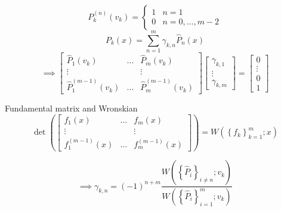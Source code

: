 \documentclass{beamer}
\newcommand{\set}[1]{\left \{ #1 \right \}}
\newcommand{\W}[2]{W \left ( #1 ; #2 \right )}
\begin{document}
\begin{frame}
\begin{equation*}
P_k^{(n)}(v_k) = \begin{cases} 1 & n = 1 \\ 0 & n = 0,...,m-2 \end{cases}
\end{equation*}
\begin{equation*}
P_k(x) = \sum_{n=1}^m \gamma_{k,n} \hat{P}_n(x)
\end{equation*}
\begin{equation*}
\implies \begin{bmatrix} \hat{P}_1(v_k) & \dots & \hat{P}_m(v_k) \\ \vdots & & \vdots \\ \hat{P}_1^{(m-1)}(v_k) & \dots & \hat{P}_m^{(m-1)}(v_k) \end{bmatrix} \begin{bmatrix} \gamma_{k,1} \\ \vdots \\ \gamma_{k,m} \end{bmatrix} = \begin{bmatrix} 0 \\ \vdots \\ 0 \\ 1 \end{bmatrix}
\end{equation*}
\end{frame}

\begin{frame}
\begin{block}{Fundamental matrix and Wronskian}
\begin{equation*}
\det \left ( \begin{bmatrix} f_1(x) & \dots & f_m(x) \\ \vdots & & \vdots \\ f_1^{(m-1)}(x) & \dots & f_m^{(m-1)}(x) \end{bmatrix} \right ) = \W{\set{f_k}_{k=1}^m}{x}
\end{equation*}
\end{block}
\begin{equation*}
\implies \gamma_{k,n} = (-1)^{n+m} \frac{ \W{\set{\hat{P}_i}_{i \neq n}}{v_k} }{ \W{\set{\hat{P}_i}_{i=1}^m}{v_k} }
\end{equation*}
\end{frame}
\end{document}
